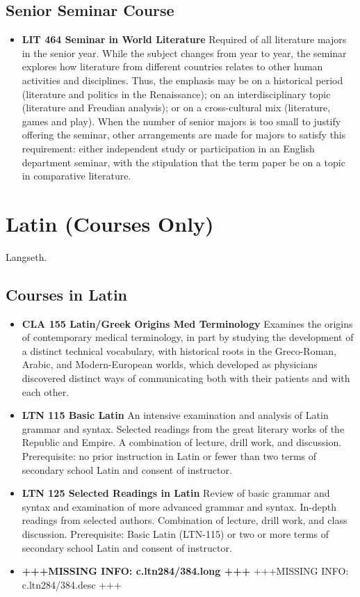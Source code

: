\documentclass[
  letterpaper,
]{scrbook}
\providecommand{\tightlist}{%
  \setlength{\itemsep}{0pt}\setlength{\parskip}{0pt}}
\begin{document}
\subsection{Senior Seminar Course}\label{senior-seminar-course}

\begin{itemize}
\tightlist
\item
  \textbf{LIT 464 Seminar in World Literature} Required of all
  literature majors in the senior year. While the subject changes from
  year to year, the seminar explores how literature from different
  countries relates to other human activities and disciplines. Thus, the
  emphasis may be on a historical period (literature and politics in the
  Renaissance); on an interdisciplinary topic (literature and Freudian
  analysis); or on a cross-cultural mix (literature, games and play).
  When the number of senior majors is too small to justify offering the
  seminar, other arrangements are made for majors to satisfy this
  requirement: either independent study or participation in an English
  department seminar, with the stipulation that the term paper be on a
  topic in comparative literature.
\end{itemize}

\section{Latin (Courses Only)}\label{sec-latin}

Langseth.

\subsection{Courses in Latin}\label{courses-in-latin}

\begin{itemize}
\tightlist
\item
  \textbf{CLA 155 Latin/Greek Origins Med Terminology} Examines the
  origins of contemporary medical terminology, in part by studying the
  development of a distinct technical vocabulary, with historical roots
  in the Greco-Roman, Arabic, and Modern-European worlds, which
  developed as physicians discovered distinct ways of communicating both
  with their patients and with each other.
\item
  \textbf{LTN 115 Basic Latin} An intensive examination and analysis of
  Latin grammar and syntax. Selected readings from the great literary
  works of the Republic and Empire. A combination of lecture, drill
  work, and discussion. Prerequisite: no prior instruction in Latin or
  fewer than two terms of secondary school Latin and consent of
  instructor.
\item
  \textbf{LTN 125 Selected Readings in Latin} Review of basic grammar
  and syntax and examination of more advanced grammar and syntax.
  In-depth readings from selected authors. Combination of lecture, drill
  work, and class discussion. Prerequisite: Basic Latin (LTN-115) or two
  or more terms of secondary school Latin and consent of instructor.
\item
  \textbf{+++MISSING INFO: c.ltn284/384.long +++} +++MISSING INFO:
  c.ltn284/384.desc +++
\end{itemize}
\end{document}
